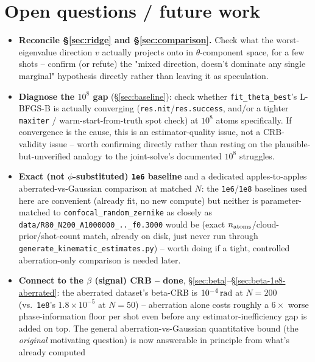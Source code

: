 \documentclass[11pt,a4paper]{article}
\newcommand{\code}[1]{\texttt{#1}}
\begin{document}
\section{Open questions / future work}
\label{sec:open}

\begin{itemize}
  \item \textbf{Reconcile \S\ref{sec:ridge} and \S\ref{sec:comparison}.}
    Check what the worst-eigenvalue direction $v$ actually projects onto in
    $\theta$-component space, for a few shots -- confirm (or refute) the
    "mixed direction, doesn't dominate any single marginal" hypothesis
    directly rather than leaving it as speculation.
  \item \textbf{Diagnose the $10^8$ gap} (\S\ref{sec:baseline}): check
    whether \code{fit\_theta\_best}'s L-BFGS-B is actually converging
    (\code{res.nit}/\code{res.success}, and/or a tighter \code{maxiter} /
    warm-start-from-truth spot check) at $10^8$ atoms specifically. If
    convergence is the cause, this is an estimator-quality issue, not a
    CRB-validity issue -- worth confirming directly rather than resting on
    the plausible-but-unverified analogy to the joint-solve's documented
    $10^8$ struggles.
  \item \textbf{Exact (not $\phi$-substituted) \code{1e6} baseline} and a
    dedicated apples-to-apples aberrated-vs-Gaussian comparison at matched
    $N$: the \code{1e6}/\code{1e8} baselines used here are convenient
    (already fit, no new compute) but neither is parameter-matched to
    \code{confocal\_random\_zernike} as closely as
    \code{data/R80\_N200\_A1000000\_..\_f0.3000} would be (exact $n_{\rm
    atoms}$/cloud-prior/shot-count match, already on disk, just never run
    through \code{generate\_kinematic\_estimates.py}) -- worth doing if a
    tight, controlled aberration-only comparison is needed later.
  \item \textbf{Connect to the $\beta$ (signal) CRB -- done}, \S\ref{sec:beta}--\S\ref{sec:beta-1e8-aberrated}:
    the aberrated dataset's beta-CRB is $10^{-4}\,{\rm rad}$ at $N{=}200$
    (vs.\ \code{1e8}'s $1.8\times10^{-5}$ at $N{=}50$) -- aberration alone
    costs roughly a $6\times$ worse phase-information floor per shot even
    before any estimator-inefficiency gap is added on top. The general
    aberration-vs-Gaussian quantitative bound (the \emph{original} motivating
    question) is now answerable in principle from what's already computed

\end{itemize}
\end{document}
